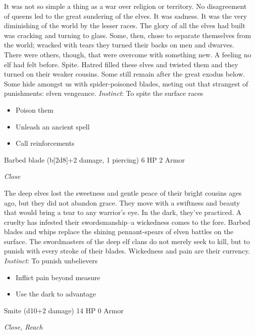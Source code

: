 \HRule
It was not so simple a thing as a war over religion or territory. No disagreement of queens led to the great sundering of the elves. It was sadness. It was the very diminishing of the world by the lesser races. The glory of all the elves had built was cracking and turning to glass. Some, then, chose to separate themselves from the world; wracked with tears they turned their backs on men and dwarves. There were others, though, that were overcome with something new. A feeling no elf had felt before. Spite. Hatred filled these elves and twisted them and they turned on their weaker cousins. Some still remain after the great exodus below. Some hide amongst us with spider-poisoned blades, meting out that strangest of punishments: elven vengeance. \emph{Instinct}: To spite the surface races
\begin{itemize}
\item Poison them
\item Unleash an ancient spell
\item Call reinforcements
\end{itemize}
\newpage
\HRule
{}

Barbed blade (b[2d8]+2 damage, 1 piercing)\hspace*{\fill} 6 HP 2 Armor

\emph{Close}

\HRule
The deep elves lost the sweetness and gentle peace of their bright cousins ages ago, but they did not abandon grace. They move with a swiftness and beauty that would bring a tear to any warrior's eye. In the dark, they've practiced. A cruelty has infested their swordsmanship--a wickedness comes to the fore. Barbed blades and whips replace the shining pennant-spears of elven battles on the surface. The swordmasters of the deep elf clans do not merely seek to kill, but to punish with every stroke of their blades. Wickedness and pain are their currency. \emph{Instinct}: To punish unbelievers
\begin{itemize}
\item Inflict pain beyond measure
\item Use the dark to advantage
\end{itemize}

\HRule
{}

Smite (d10+2 damage)\hspace*{\fill} 14 HP 0 Armor

\emph{Close, Reach}

